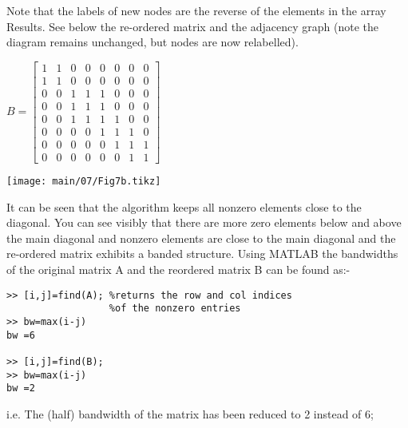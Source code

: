 \noindent
Note that the labels of new nodes are the reverse of the elements in the array
Results.  See below the re-ordered matrix and the adjacency graph (note the
diagram remains unchanged, but nodes are now relabelled).
\vskip 5pt
\noindent
\begin{table}[H]
  \begin{minipage}[b]{0.50\linewidth}
    \vskip 5pt
    \begin{center}
      $B=
      \begin{bmatrix}
        1 & 1 & 0 & 0 & 0 & 0 & 0 & 0 \\
        1 & 1 & 0 & 0 & 0 & 0 & 0 & 0 \\
        0 & 0 & 1 & 1 & 1 & 0 & 0 & 0 \\
        0 & 0 & 1 & 1 & 1 & 0 & 0 & 0 \\
        0 & 0 & 1 & 1 & 1 & 1 & 0 & 0 \\
        0 & 0 & 0 & 0 & 1 & 1 & 1 & 0 \\
        0 & 0 & 0 & 0 & 0 & 1 & 1 & 1 \\
        0 & 0 & 0 & 0 & 0 & 0 & 1 & 1
      \end{bmatrix}$
    \end{center}
    \vspace{5mm}
  \end{minipage}
  \begin{minipage}[b]{0.49\linewidth}
    \begin{center}
      \texttt{[image: main/07/Fig7b.tikz]}
    \end{center}
  \end{minipage}
\end{table}
\vskip -12pt
\noindent
It can be seen that the algorithm keeps all nonzero elements close to the
diagonal.  You can see visibly that there are more zero elements below and above
the main diagonal and nonzero elements are close to the main diagonal and the
re-ordered matrix exhibits a banded structure.
\vskip 6pt
\noindent
Using MATLAB the bandwidths of the original matrix A and the reordered matrix B
can be found as:-
\vskip 12pt
\noindent
\ttfamily
\begin{lstlisting}
>> [i,j]=find(A); %returns the row and col indices
                  %of the nonzero entries
>> bw=max(i-j)
bw =6

>> [i,j]=find(B);
>> bw=max(i-j)
bw =2
\end{lstlisting}
\rmfamily
\vskip 12pt
\noindent
i.e. The (half) bandwidth of the matrix has been reduced to 2 instead of 6;
